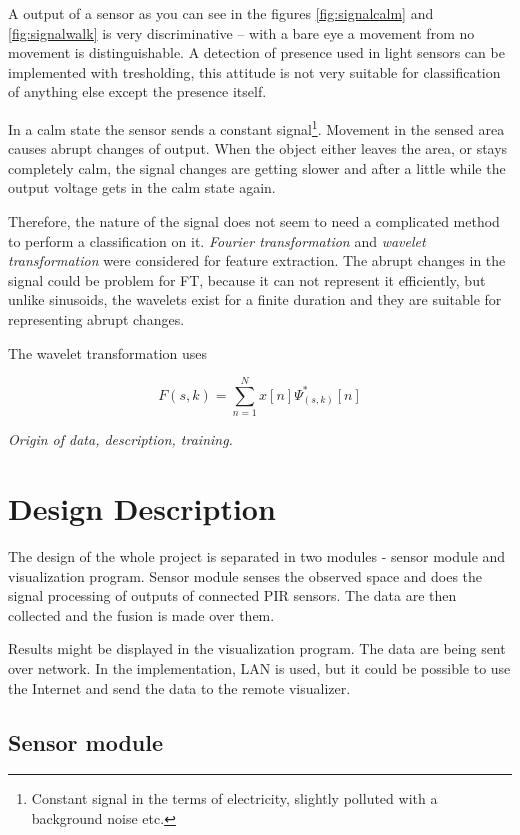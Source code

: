 A output of a sensor as you can see in the figures \ref{fig:signalcalm} and \ref{fig:signalwalk}
is very discriminative -- with a bare eye a movement from no movement is distinguishable.
A detection of presence used in light sensors can be implemented with tresholding, this attitude is
not very suitable for classification of anything else except the presence itself.

In a calm state the sensor sends a constant signal\footnote{Constant signal in the terms
of electricity, slightly polluted with a background noise etc.}. Movement in the sensed area causes
abrupt changes of output. When the object either leaves the area, or stays completely calm, the signal
changes are getting slower and after a little while the output voltage gets in the calm state again.

Therefore, the nature of the signal does not seem to need a complicated method to perform a classification on it.
{\it Fourier transformation} and {\it wavelet transformation} were considered for feature
extraction. The abrupt changes in the signal could be problem for FT, because it can not represent
it efficiently\cite{SinglePIR}, %
but unlike sinusoids, the wavelets exist for a finite duration and they are suitable for representing
abrupt changes.

The wavelet transformation uses 

\begin{equation}
F(s,k) = \sum_{n=1}^{N} x[n] \Psi_{(s,k)}^{*}[n]
\end{equation}

{\it Origin of data, description, training.}




\chapter{Design Description}

The design of the whole project is separated in two modules - sensor module
and visualization program. Sensor module senses the observed space and does the
signal processing of outputs of connected PIR sensors. The data are then collected
and the fusion is made over them.

Results might be displayed in the visualization program. The data are being sent
over network. In the implementation, LAN is used, but it could be possible to
use the Internet and send the data to the remote visualizer.


\section{Sensor module}

